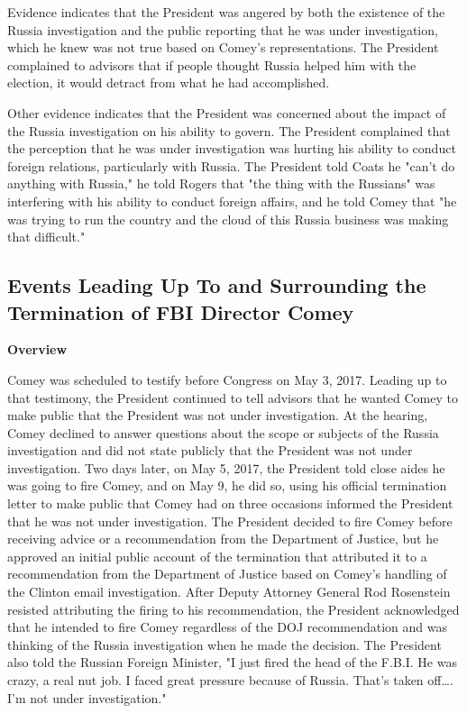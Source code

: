 Evidence indicates that the President was angered by both the existence of the Russia investigation and the public reporting that he was under investigation, which he knew was not true based on Comey's representations.
The President complained to advisors that if people thought Russia helped him with the election, it would detract from what he had accomplished.

Other evidence indicates that the President was concerned about the impact of the Russia investigation on his ability to govern.
The President complained that the perception that he was under investigation was hurting his ability to conduct foreign relations, particularly with Russia.
The President told Coats he "can't do anything with Russia," he told Rogers that "the thing with the Russians" was interfering with his ability to conduct foreign affairs, and he told Comey that "he was trying to run the country and the cloud of this Russia business was making that difficult."

\subsection{Events Leading Up To and Surrounding the Termination of FBI Director Comey}

\begin{center}
\textbf{Overview}
\end{center}

Comey was scheduled to testify before Congress on May 3, 2017.
Leading up to that testimony, the President continued to tell advisors that he wanted Comey to make public that the President was not under investigation.
At the hearing, Comey declined to answer questions about the scope or subjects of the Russia investigation and did not state publicly that the President was not under investigation.
Two days later, on May 5, 2017, the President told close aides he was going to fire Comey, and on May 9, he did so, using his official termination letter to make public that Comey had on three occasions informed the President that he was not under investigation.
The President decided to fire Comey before receiving advice or a recommendation from the Department of Justice, but he approved an initial public account of the termination that attributed it to a recommendation from the Department of Justice based on Comey's handling of the Clinton email investigation.
After Deputy Attorney General Rod Rosenstein resisted attributing the firing to his recommendation, the President acknowledged that he intended to fire Comey regardless of the DOJ recommendation and was thinking of the Russia investigation when he made the decision.
The President also told the Russian Foreign Minister, "I just fired the head of the F.B.I.
He was crazy, a real nut job.
I faced great pressure because of Russia.
That's taken off\dots.
I'm not under investigation."

